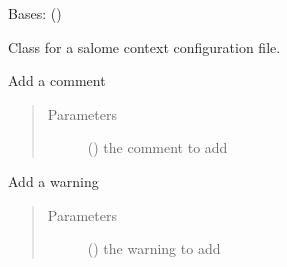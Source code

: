 \documentclass[a4paper,10pt,english]{sphinxmanual}
\begin{document}
\begin{fulllineitems}
\label{\detokenize{commands/apidoc/src:src.fileEnviron.ContextFileEnviron}}
Bases: {\hyperref[\detokenize{commands/apidoc/src:src.fileEnviron.FileEnviron}]{}} ()

Class for a salome context configuration file.

\begin{fulllineitems}
\label{\detokenize{commands/apidoc/src:src.fileEnviron.ContextFileEnviron.add_echo}}
Add a comment
\begin{quote}\begin{description}
\item[{Parameters}] \leavevmode
{} () \textendash{} the comment to add

\end{description}\end{quote}

\end{fulllineitems}


\begin{fulllineitems}
\label{\detokenize{commands/apidoc/src:src.fileEnviron.ContextFileEnviron.add_warning}}
Add a warning
\begin{quote}\begin{description}
\item[{Parameters}] \leavevmode
{} () \textendash{} the warning to add

\end{description}\end{quote}

\end{fulllineitems}


\end{fulllineitems}
\end{document}
